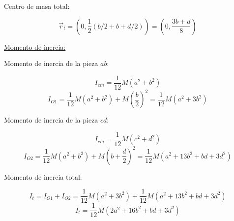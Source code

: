 \documentclass[letter,11pt]{article}
\begin{document}
Centro de masa total:

\begin{equation}
    \vec{r}_{t} = \left(0, \frac{1}{2} \left(b/2 + b + d/2\right)\right) = \left(0, \frac{3b + d}{8}\right)
\end{equation}
\vspace{0.3cm}

\underline{Momento de inercia:}

Momento de inercia de la pieza $ab$:

\begin{equation*}
    I_{cm} = \frac{1}{12} M (a^2 + b^2)
\end{equation*}
\begin{equation*}
    I_{O1} = \frac{1}{12} M (a^2 + b^2) + M \left(\frac{b}{2}\right)^2 = \frac{1}{12} M (a^2 + 3b^2)
\end{equation*}
\vspace{-0.1cm}

Momento de inercia de la pieza $cd$:

\begin{equation*}
    I_{cm} = \frac{1}{12} M (c^2 + d^2)
\end{equation*}
\begin{equation*}
    I_{O2} = \frac{1}{12} M (a^2 + b^2) + M \left(b + \frac{d}{2}\right)^2 = \frac{1}{12} M (a^2 + 13 b^2 + bd + 3 d^2)
\end{equation*}
\vspace{-0.1cm}

Momento de inercia total:

\begin{equation*}
    I_{t} = I_{O1} + I_{O2} = \frac{1}{12} M (a^2 + 3b^2) +  \frac{1}{12} M (a^2 + 13 b^2 + bd + 3 d^2)
\end{equation*}
\begin{equation}
    I_{t} = \frac{1}{12} M (2a^2 + 16 b^2 + bd + 3d^2)
\end{equation}
\end{document}
